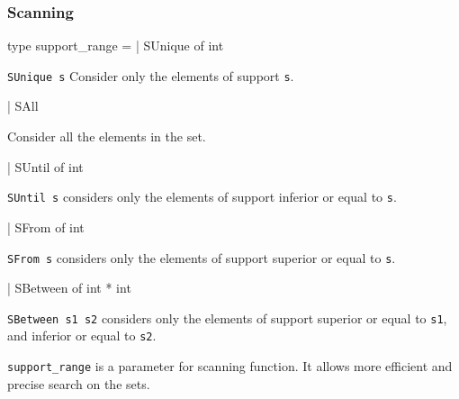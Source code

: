 \subsubsection{Scanning}




\label{type:Constraint.support-underscorerange}\begin{ocamldoccode}
type support_range =
  | SUnique of int
\end{ocamldoccode}
\begin{ocamldoccomment}
{\tt{SUnique s}} Consider only the elements of support {\tt{s}}.
\end{ocamldoccomment}
\begin{ocamldoccode}
  | SAll
\end{ocamldoccode}
\begin{ocamldoccomment}
Consider all the elements in the set.
\end{ocamldoccomment}
\begin{ocamldoccode}
  | SUntil of int
\end{ocamldoccode}
\begin{ocamldoccomment}
{\tt{SUntil s}} considers only the elements of support inferior or equal to {\tt{s}}.
\end{ocamldoccomment}
\begin{ocamldoccode}
  | SFrom of int
\end{ocamldoccode}
\begin{ocamldoccomment}
{\tt{SFrom s}} considers only the elements of support superior or equal to {\tt{s}}.
\end{ocamldoccomment}
\begin{ocamldoccode}
  | SBetween of int * int
\end{ocamldoccode}
\begin{ocamldoccomment}
{\tt{SBetween s1 s2}} considers only the elements of support superior or equal to {\tt{s1}}, and inferior or equal to {\tt{s2}}.
\end{ocamldoccomment}
\begin{ocamldocdescription}
{\tt{support\_range}} is a parameter for scanning function.
    It allows more efficient and precise search on the sets.


\end{ocamldocdescription}




